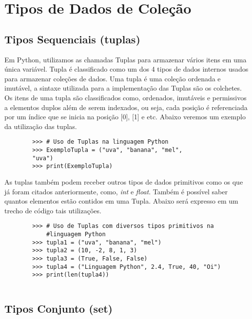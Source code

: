     \section{Tipos de Dados de Cole\c{c}\~{a}o}


            \subsection{Tipos Sequenciais (tuplas)}
     Em Python, utilizamos as chamadas Tuplas para armazenar vários itens em uma única variável. Tupla é classificado como um dos 4 tipos de dados internos usados para armazenar coleções de dados. Uma tupla é uma coleção ordenada e imutável, a sintaxe utilizada para a implementação das Tuplas são os colchetes. \\
     
     Os itens de uma tupla são classificados como, ordenados, imutáveis e permissivos a elementos duplos além de serem indexados, ou seja, cada posição é referenciada por um índice que se inicia na posição [0], [1] e etc. Abaixo veremos um exemplo da utilização das tuplas.
     \begin{lstlisting}
     	>>> # Uso de Tuplas na linguagem Python
     	>>> ExemploTupla = ("uva", "banana", "mel", 
     	"uva")
     	>>> print(ExemploTupla)
     \end{lstlisting}
 
    As tuplas também podem receber outros tipos de dados primitivos como os que já foram citados anteriormente, como, \textit{int} e \textit{float}. Também é possível saber quantos elementos estão contidos em uma Tupla. Abaixo será expresso em um trecho de código tais utilizações.
     
    \begin{lstlisting}
    	>>> # Uso de Tuplas com diversos tipos primitivos na
            #linguagem Python
    	>>> tupla1 = ("uva", "banana", "mel")
    	>>> tupla2 = (10, -2, 8, 1, 3)
    	>>> tupla3 = (True, False, False)
    	>>> tupla4 = ("Linguagem Python", 2.4, True, 40, "Oi")
    	>>> print(len(tupla4))
    	
    \end{lstlisting} 
     
            \subsection{Tipos Conjunto (set)}

